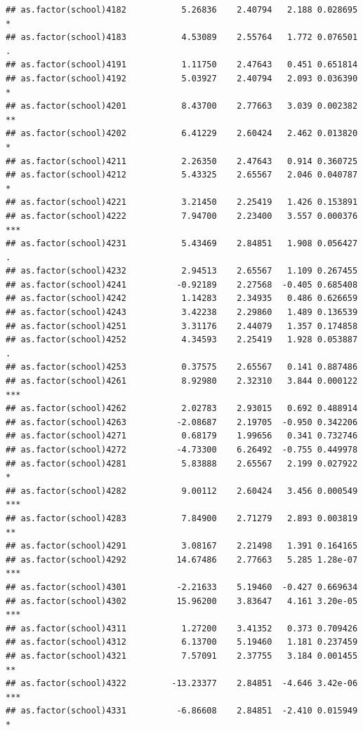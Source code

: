 \documentclass[ignorenonframetext,]{beamer}
\begin{document}
\begin{frame}[fragile]{}
\begin{verbatim}
## as.factor(school)4182           5.26836    2.40794   2.188 0.028695 *  
## as.factor(school)4183           4.53089    2.55764   1.772 0.076501 .  
## as.factor(school)4191           1.11750    2.47643   0.451 0.651814    
## as.factor(school)4192           5.03927    2.40794   2.093 0.036390 *  
## as.factor(school)4201           8.43700    2.77663   3.039 0.002382 ** 
## as.factor(school)4202           6.41229    2.60424   2.462 0.013820 *  
## as.factor(school)4211           2.26350    2.47643   0.914 0.360725    
## as.factor(school)4212           5.43325    2.65567   2.046 0.040787 *  
## as.factor(school)4221           3.21450    2.25419   1.426 0.153891    
## as.factor(school)4222           7.94700    2.23400   3.557 0.000376 ***
## as.factor(school)4231           5.43469    2.84851   1.908 0.056427 .  
## as.factor(school)4232           2.94513    2.65567   1.109 0.267455    
## as.factor(school)4241          -0.92189    2.27568  -0.405 0.685408    
## as.factor(school)4242           1.14283    2.34935   0.486 0.626659    
## as.factor(school)4243           3.42238    2.29860   1.489 0.136539    
## as.factor(school)4251           3.31176    2.44079   1.357 0.174858    
## as.factor(school)4252           4.34593    2.25419   1.928 0.053887 .  
## as.factor(school)4253           0.37575    2.65567   0.141 0.887486    
## as.factor(school)4261           8.92980    2.32310   3.844 0.000122 ***
## as.factor(school)4262           2.02783    2.93015   0.692 0.488914    
## as.factor(school)4263          -2.08687    2.19705  -0.950 0.342206    
## as.factor(school)4271           0.68179    1.99656   0.341 0.732746    
## as.factor(school)4272          -4.73300    6.26492  -0.755 0.449978    
## as.factor(school)4281           5.83888    2.65567   2.199 0.027922 *  
## as.factor(school)4282           9.00112    2.60424   3.456 0.000549 ***
## as.factor(school)4283           7.84900    2.71279   2.893 0.003819 ** 
## as.factor(school)4291           3.08167    2.21498   1.391 0.164165    
## as.factor(school)4292          14.67486    2.77663   5.285 1.28e-07 ***
## as.factor(school)4301          -2.21633    5.19460  -0.427 0.669634    
## as.factor(school)4302          15.96200    3.83647   4.161 3.20e-05 ***
## as.factor(school)4311           1.27200    3.41352   0.373 0.709426    
## as.factor(school)4312           6.13700    5.19460   1.181 0.237459    
## as.factor(school)4321           7.57091    2.37755   3.184 0.001455 ** 
## as.factor(school)4322         -13.23377    2.84851  -4.646 3.42e-06 ***
## as.factor(school)4331          -6.86608    2.84851  -2.410 0.015949 *  

\end{verbatim}
\end{frame}
\end{document}
